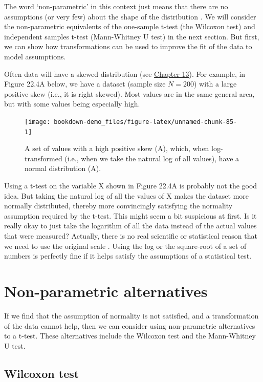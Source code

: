 \documentclass[
  openany]{krantz}
\begin{document}
The word `non-parametric' in this context just means that there are no assumptions (or very few) about the shape of the distribution \citep{Dytham2011}.
We will consider the non-parametric equivalents of the one-sample t-test (the Wilcoxon test) and independent samples t-test (Mann-Whitney U test) in the next section.
But first, we can show how transformations can be used to improve the fit of the data to model assumptions.

Often data will have a skewed distribution (see \protect\hyperlink{Chapter_13}{Chapter 13}).
For example, in Figure 22.4A below, we have a dataset (sample size \(N = 200\)) with a large positive skew (i.e., it is right skewed).
Most values are in the same general area, but with some values being especially high.

\begin{figure}
\texttt{[image: bookdown-demo\_files/figure-latex/unnamed-chunk-85-1]} \caption{A set of values with a high positive skew (A), which, when log-transformed (i.e., when we take the natural log of all values), have a normal distribution (A).}\label{fig:unnamed-chunk-85}
\end{figure}

Using a t-test on the variable X shown in Figure 22.4A is probably not the good idea.
But taking the natural log of all the values of X makes the dataset more normally distributed, thereby more convincingly satisfying the normality assumption required by the t-test.
This might seem a bit suspicious at first.
Is it really okay to just take the logarithm of all the data instead of the actual values that were measured?
Actually, there is no real scientific or statistical reason that we need to use the original scale \citep{Sokal1995}.
Using the log or the square-root of a set of numbers is perfectly fine if it helps satisfy the assumptions of a statistical test.

\hypertarget{non-parametric-alternatives}{%
\section{Non-parametric alternatives}\label{non-parametric-alternatives}}

If we find that the assumption of normality is not satisfied, and a transformation of the data cannot help, then we can consider using non-parametric alternatives to a t-test.
These alternatives include the Wilcoxon test and the Mann-Whitney U test.

\hypertarget{wilcoxon-test}{%
\subsection{Wilcoxon test}\label{wilcoxon-test}}
\end{document}
